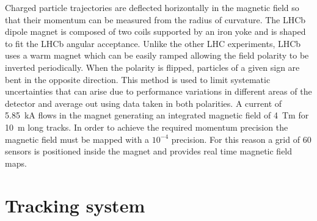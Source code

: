 Charged particle trajectories are deflected horizontally in the magnetic field
so that their momentum can be measured from the radius of curvature.
The LHCb dipole magnet is composed of two coils supported by an iron yoke
and is shaped to fit the LHCb angular acceptance. Unlike the other LHC experiments,
LHCb uses a warm magnet which can be easily ramped allowing the field polarity to be inverted periodically.
When the polarity is flipped, particles of a given sign are bent in the opposite direction.
This method is used to limit systematic uncertainties that can arise due to performance
variations in different areas of the detector and average out using data taken in both polarities.
A current of 5.85~kA flows in the magnet generating an integrated magnetic field of 4~Tm for 10~m long tracks.
In order to achieve the required momentum precision the magnetic field must be mapped with
a $10^{-4}$ precision. For this reason a grid of 60 sensors is positioned inside the magnet
and provides real time magnetic field maps.

\section{Tracking system}
\label{sec:tracking}

